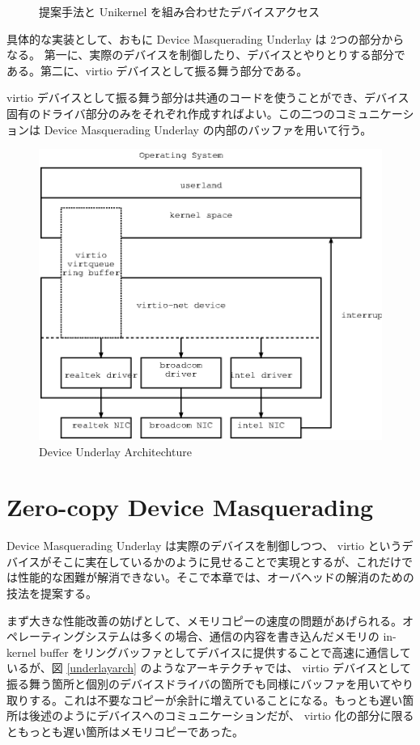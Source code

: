 \documentclass[a4paper,11pt,report]{ltjsbook}
\begin{document}
\begin{figure}[htbp]
\begin{minipage}{0.5\hsize}
\begin{center}
    \caption{提案手法と Unikernel を組み合わせたデバイスアクセス}
    \label{unduni}
  \end{center}
  \end{minipage}
\end{figure}

具体的な実装として、おもに Device Masquerading Underlay は 2つの部分からなる。
第一に、実際のデバイスを制御したり、デバイスとやりとりする部分である。第二に、virtio デバイスとして振る舞う部分である。

virtio デバイスとして振る舞う部分は共通のコードを使うことができ、デバイス固有のドライバ部分のみをそれぞれ作成すればよい。この二つのコミュニケーションは Device Masquerading Underlay の内部のバッファを用いて行う。

\begin{figure}[htbp]
  \begin{center}
    \includegraphics[width=.7\textwidth]{./archtech.eps}
    \caption{Device Underlay Architechture}
    \label{ulayarch}
  \end{center}
\end{figure}


\section{Zero-copy Device Masquerading}

Device Masquerading Underlay は実際のデバイスを制御しつつ、 virtio というデバイスがそこに実在しているかのように見せることで実現とするが、これだけでは性能的な困難が解消できない。そこで本章では、オーバヘッドの解消のための技法を提案する。

まず大きな性能改善の妨げとして、メモリコピーの速度の問題があげられる。オペレーティングシステムは多くの場合、通信の内容を書き込んだメモリの in-kernel buffer をリングバッファとしてデバイスに提供することで高速に通信しているが、図 \ref{underlayarch} のようなアーキテクチャでは、 virtio デバイスとして振る舞う箇所と個別のデバイスドライバの箇所でも同様にバッファを用いてやり取りする。これは不要なコピーが余計に増えていることになる。もっとも遅い箇所は後述のようにデバイスへのコミュニケーションだが、 virtio 化の部分に限るともっとも遅い箇所はメモリコピーであった。
\end{document}
